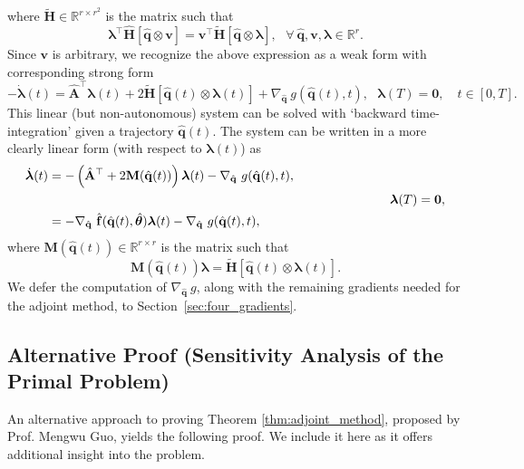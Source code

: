 where $\tilde{\mathbf{H}}\in\mathbb{R}^{r\times r^2}$ is the matrix such that\\
$$\bm{\lambda}^{\top}\hat{\mathbf{H}}[\hat{\mathbf{q}}\otimes \mathbf{v}] = \mathbf{v}^{\top}\tilde{\mathbf{H}}[\hat{\mathbf{q}}\otimes \bm{\lambda}],~~~\forall~\hat{\mathbf{q}}, \mathbf{v}, \bm{\lambda} \in \mathbb{R}^r.$$
Since $\mathbf{v}$ is arbitrary, we recognize the above expression as a weak form with corresponding strong form\\
\begin{equation*}
    -\dot{\bm{\lambda}}(t) = \hat{\mathbf{A}}^{\top} \bm{\lambda}(t) + 2\tilde{\mathbf{H}}[\hat{\mathbf{q}}(t)\otimes \bm{\lambda}(t)] + \nabla_{\hat{\mathbf{q}}}~g(\hat{\mathbf{q}}(t),t),~~~\bm{\lambda}(T)=\bm{0},\quad t\in [0,T].
\end{equation*}
This linear (but non-autonomous) system can be solved with `backward time-integration' given a trajectory $\hat{\mathbf{q}}(t)$. The system can be written in a more clearly linear form (with respect to $\bm{\lambda}(t)$) as\\
\begin{align}
    \label{eq:gradient_fq}
     \dot{\bm{\lambda}}(t) &= -\left(\hat{\mathbf{A}}^{\top} + 2\mathbf{M}(\hat{\mathbf{q}}(t))\right)\bm{\lambda}(t) - \nabla_{\hat{\mathbf{q}}}~g(\hat{\mathbf{q}}(t),t),\notag\\
    &~\hspace{8.8cm}~~~~~\bm{\lambda}(T)=\bm{0},\\
    &= -\nabla_{\hat{\mathbf{q}}}~\hat{\mathbf{f}}(\hat{\mathbf{q}}(t),\hat{\bm{\theta}})\bm{\lambda}(t) - \nabla_{\hat{\mathbf{q}}}~g(\hat{\mathbf{q}}(t),t)\notag,
\end{align}
where $\mathbf{M}(\hat{\mathbf{q}}(t))\in\mathbb{R}^{r\times r}$ is the matrix such that\\
\begin{equation*}
    \mathbf{M}(\hat{\mathbf{q}}(t)) \bm{\lambda} = \tilde{\mathbf{H}}[\hat{\mathbf{q}}(t)\otimes \bm{\lambda}(t)].
\end{equation*}
We defer the computation of $\nabla_{\hat{\mathbf{q}}}~g$, along with the remaining gradients needed for the adjoint method, to Section~\ref{sec:four_gradients}.




\subsection*{Alternative Proof (Sensitivity Analysis of the Primal Problem)}
An alternative approach to proving Theorem \ref{thm:adjoint_method}, proposed by Prof. Mengwu Guo, yields the following proof. We include it here as it offers additional insight into the problem.

